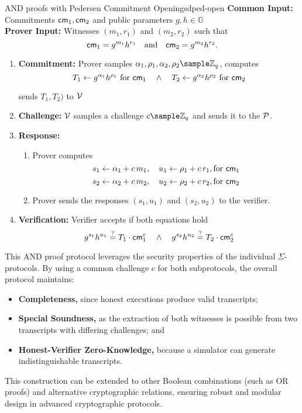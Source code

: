 \begin{protocol}{AND proofs with Pedersen Commitment Openings}{dped-open}
\textbf{Common Input:} Commitments \(\mathsf{cm}_1,\mathsf{cm}_2\) and public parameters \(g,h \in \mathbb{G}\)\\[1mm]
\textbf{Prover Input:} Witnesses \((m_1,r_1)\) and \((m_2,r_2)\) such that 
\[
  \mathsf{cm}_1 = g^{m_1}h^{r_1} \quad \text{and} \quad \mathsf{cm}_2 = g^{m_2}h^{r_2}.
\]
\begin{enumerate}
    \item \textbf{Commitment:} 
    Prover samples \(\alpha_1,\rho_1, \alpha_2,\rho_2  \sample \Z_q\), computes 
        \[
          T_1 \gets g^{\alpha_1}h^{\rho_1} \text{ for } \mathsf{cm}_1 \quad \wedge \quad T_2 \gets g^{\alpha_2}h^{\rho_2} \text{ for } \mathsf{cm}_2
        \]
    
    sends $T_1,T_2)$ to $\mathcal{V}$
    
    \item \textbf{Challenge:} $\mathcal{V}$ samples a challenge \(c \sample \Z_q\) and sends it to the $\mathcal{P}$.
    \item \textbf{Response:} 
    \begin{enumerate}
        \item Prover computes 
        \[
          s_1 \gets \alpha_1 + c\,m_1,\quad u_1 \gets \rho_1 + c\,r_1, \text{for } \mathsf{cm}_1
        \]
        \[
          s_2 \gets \alpha_2 + c\,m_2,\quad u_2 \gets \rho_2 + c\,r_2, \text{for } \mathsf{cm}_2
        \]
        \item Prover sends the responses \((s_1,u_1)\) and \((s_2,u_2)\) to the verifier.
    \end{enumerate}
    \item \textbf{Verification:} Verifier accepts if both equations hold
    \[
    g^{s_1} h^{u_1} \stackrel{?}{=} T_1 \cdot \mathsf{cm}_1^c \quad \wedge \quad g^{s_2} h^{u_2} \stackrel{?}{=} T_2 \cdot \mathsf{cm}_2^c
    \]
\end{enumerate}
\end{protocol}

This AND proof protocol leverages the security properties of the individual $\Sigma$-protocols. By using a common challenge $c$ for both subprotocols, the overall protocol maintains:
\begin{itemize}
  \item \textbf{Completeness,} since honest executions produce valid transcripts;
  \item \textbf{Special Soundness,} as the extraction of both witnesses is possible from two transcripts with differing challenges; and
  \item \textbf{Honest-Verifier Zero-Knowledge,} because a simulator can generate indistinguishable transcripts.
\end{itemize}
This construction can be extended to other Boolean combinations (such as OR proofs) and alternative cryptographic relations, ensuring robust and modular design in advanced cryptographic protocols.








